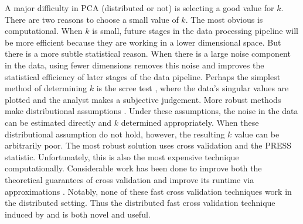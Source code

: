 \documentclass[thesis.tex]{subfiles}
\begin{document}
A major difficulty in PCA (distributed or not) is selecting a good value for $k$.
There are two reasons to choose a small value of $k$.
The most obvious is computational.
When $k$ is small, future stages in the data processing pipeline will be more efficient because they are working in a lower dimensional space.
But there is a more subtle statistical reason.
When there is a large noise component in the data,
using fewer dimensions removes this noise and improves the statistical efficiency of later stages of the data pipeline.
Perhaps the simplest method of determining $k$ is the scree test \citep{cattell1966scree},
where the data's singular values are plotted and the analyst makes a subjective judgement.
More robust methods make distributional assumptions \citep{bartlett1950tests}.
Under these assumptions, the noise in the data can be estimated directly and $k$ determined appropriately.
When these distributional assumption do not hold, however, the resulting $k$ value can be arbitrarily poor.
The most robust solution uses cross validation and the PRESS statistic.
Unfortunately, this is also the most expensive technique computationally.
Considerable work has been done to improve both the theoretical guarantees of cross validation and improve its runtime via approximations
\citep{wold1978cross,eastment1982cross,krzanowski1987cross,mertens1995efficient,diana2002cross,engelen2004fast,josse2012selecting,camacho2012cross}.
Notably, none of these fast cross validation techniques work in the distributed setting.
Thus the distributed fast cross validation technique induced by \cite{qu2002principal} and \cite{liang2013distributed} is both novel and useful.

\end{document}
